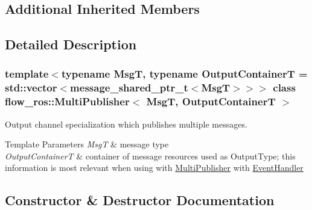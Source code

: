 \subsection*{Additional Inherited Members}


\subsection{Detailed Description}
\subsubsection*{template$<$typename MsgT, typename Output\+ContainerT = std\+::vector$<$message\+\_\+shared\+\_\+ptr\+\_\+t$<$\+Msg\+T$>$$>$$>$\newline
class flow\+\_\+ros\+::\+Multi\+Publisher$<$ Msg\+T, Output\+Container\+T $>$}

Output channel specialization which publishes multiple messages. 


\begin{DoxyTemplParams}{Template Parameters}
{\em MsgT} & message type \\
\hline
{\em Output\+ContainerT} & container of message resources used as {\ttfamily Output\+Type}; this information is most relevant when using with \hyperlink{classflow__ros_1_1_multi_publisher}{Multi\+Publisher} with \hyperlink{classflow__ros_1_1_event_handler}{Event\+Handler} \\
\hline
\end{DoxyTemplParams}


\subsection{Constructor \& Destructor Documentation}
\mbox{\label{classflow__ros_1_1_multi_publisher_a3e2ddbd297bd541cd4c7be71786a4bf0}} 
